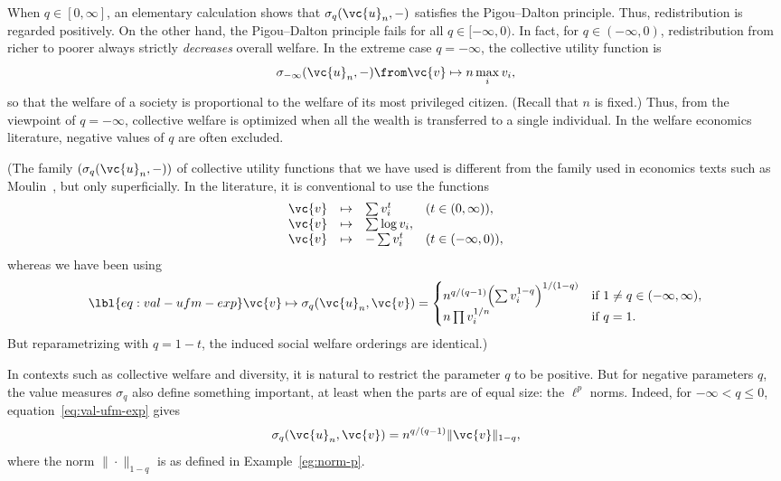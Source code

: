 \begin{example}
When $q \in [0, \infty]$, an elementary calculation shows that
$\sigma_q(\vc{u}_n, -)$ satisfies the Pigou--Dalton principle.  Thus,
redistribution%
% 
% 
is regarded positively.  On the other hand, the Pigou--Dalton principle
fails for all $q \in [-\infty, 0)$.  In fact, for $q \in (-\infty, 0)$,
  redistribution from richer to poorer always strictly \emph{decreases}
  overall welfare.  In the extreme case $q = -\infty$, the collective
  utility function is
\[
\sigma_{-\infty}(\vc{u}_n, -) \from \vc{v} \mapsto n \max_i v_i,
\]
so that the welfare of a society is proportional to the welfare of its most
privileged citizen.  (Recall that $n$ is fixed.)  Thus, from the viewpoint
of $q = -\infty$, collective welfare is optimized when all the wealth is
transferred to a single individual.  In the welfare economics literature,
negative values of $q$ are often excluded.

(The family $(\sigma_q(\vc{u}_n, -))$ of collective utility functions that
we have used is different from the family used in economics texts such as
Moulin~\cite{Moul}, but only superficially.  In the literature, it is
conventional to use the functions
\[
\begin{array}{rcll}
\vc{v}  &\mapsto        &\sum v_i^t     &(t \in (0, \infty)),   \\
\vc{v}  &\mapsto        &\sum \log v_i,         &               \\
\vc{v}  &\mapsto        &-\sum v_i^t  &(t \in (-\infty, 0)),
\end{array}
\]
whereas we have been using
% 
\begin{equation}
\lbl{eq:val-ufm-exp}
\vc{v} \mapsto \sigma_q(\vc{u}_n, \vc{v})
=
\begin{cases}
n^{q/(q - 1)} \Bigl( \sum v_i^{1 - q} \Bigr)^{1/(1 - q)}      &
\text{if } 1 \neq q \in (-\infty, \infty),      \\
n \prod v_i^{1/n}       &
\text{if } q = 1.
\end{cases}
\end{equation}
% 
But reparametrizing with $q = 1 - t$, the induced social welfare orderings
are identical.)
\end{example}

\begin{example}
In contexts such as collective welfare and diversity, it is natural to
restrict the parameter $q$ to be positive.  But for negative parameters
$q$, the value measures $\sigma_q$ also define something important, at
least when the parts are of equal size: the $\ell^p$
norms.  Indeed, for $-\infty < q \leq 0$, equation~\eqref{eq:val-ufm-exp}
gives
\[
\sigma_q(\vc{u}_n, \vc{v})      
=
n^{q/(q - 1)} \|\vc{v}\|_{1 - q},
\]
where the norm $\|\cdot\|_{1 - q}$ is as defined in
Example~\ref{eg:norm-p}.
\end{example}

